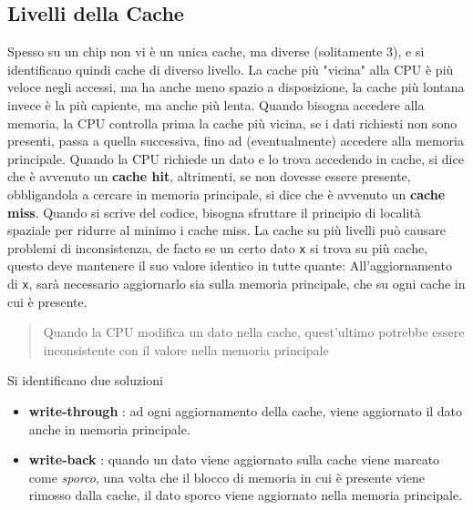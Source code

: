 \documentclass[10pt, letterpaper]{report}
\begin{document}
\subsection{Livelli della Cache}
Spesso su un chip non vi è un unica cache, ma diverse (solitamente 3), e si identificano quindi cache di diverso livello. La cache più "vicina" alla CPU è più veloce negli accessi, ma ha anche meno spazio a disposizione, la cache più lontana invece è la più capiente, ma anche più lenta.\acc 
Quando bisogna accedere alla memoria, la CPU controlla prima la cache più vicina, se  i dati richiesti non sono presenti, passa a quella successiva, fino ad (eventualmente) accedere alla memoria principale.\acc 
Quando la CPU richiede un dato e lo trova accedendo in cache, si dice che è avvenuto un \textbf{cache hit}, altrimenti, se non dovesse essere presente, obbligandola a cercare in memoria principale, si dice che è avvenuto un \textbf{cache miss}. Quando si scrive del codice, bisogna sfruttare il principio di località spaziale per ridurre al minimo i cache miss.\acc 
La cache su più livelli può causare problemi di inconsistenza, de facto se un certo dato \texttt{x} si trova su più cache, questo deve mantenere il suo valore identico in tutte quante: All'aggiornamento di \texttt{x}, sarà necessario aggiornarlo sia sulla memoria principale, che su ogni cache in cui è presente.\begin{quote}
    Quando la CPU modifica un dato nella cache, quest'ultimo potrebbe essere inconsistente con il valore nella memoria principale
\end{quote}
Si identificano due soluzioni\begin{itemize}
    \item \textbf{write-through} : ad ogni aggiornamento della cache, viene aggiornato il dato anche in memoria principale.
    \item \textbf{write-back} : quando un dato viene aggiornato sulla cache viene marcato come \textit{sporco}, una volta che il blocco di memoria in cui è presente viene rimosso dalla cache, il dato sporco viene aggiornato nella memoria principale.
\end{itemize}
\flowerLine
\end{document}

